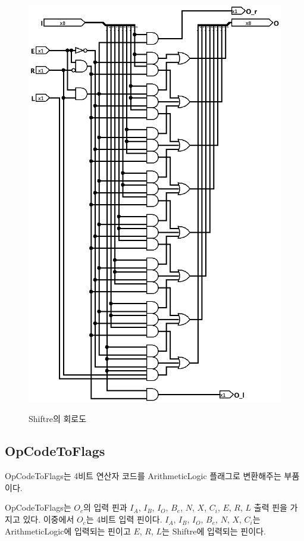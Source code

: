\documentclass{article}
\begin{document}
\begin{figure}[p]
    \centering
    \includegraphics[scale=0.5]{Shiftre} \\
    \caption{Shiftre의 회로도}
    \label{fig:shr}
\end{figure}

\pagebreak

\subsection{OpCodeToFlags}

OpCodeToFlags는 4비트 연산자 코드를 ArithmeticLogic 플래그로 변환해주는
부품이다.

OpCodeToFlags는 $O_c$의 입력 핀과
$I_A$, $I_B$, $I_O$, $B_e$, $N$, $X$, $C_i$, $E$, $R$, $L$ 출력 핀을 가지고 있다.
이중에서 $O_c$는 4비트 입력 핀이다.
$I_A$, $I_B$, $I_O$, $B_e$, $N$, $X$, $C_i$는 ArithmeticLogic에 입력되는 핀이고
$E$, $R$, $L$는 Shiftre에 입력되는 핀이다.
\end{document}

